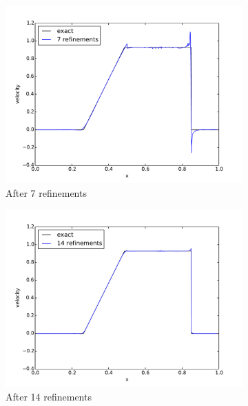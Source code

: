 \documentclass[preprint,12pt]{elsarticle}
\begin{document}
\begin{figure}[p]
\begin{subfigure}[c]{0.3\textwidth}
\includegraphics[width=\textwidth]{SpaceTimeCNS/Sod1e-5/vel8.pdf}
\caption{After 7 refinements}
\label{fig:sod_vel7}
\end{subfigure}
\begin{subfigure}[c]{0.3\textwidth}
\centering
\includegraphics[width=\textwidth]{SpaceTimeCNS/Sod1e-5/vel15.pdf}
\caption{After 14 refinements}
\label{fig:sod_vel14}
\end{subfigure}
\begin{subfigure}[c]{0.3\textwidth}
\centering

\end{subfigure}
\end{figure}
\end{document}
